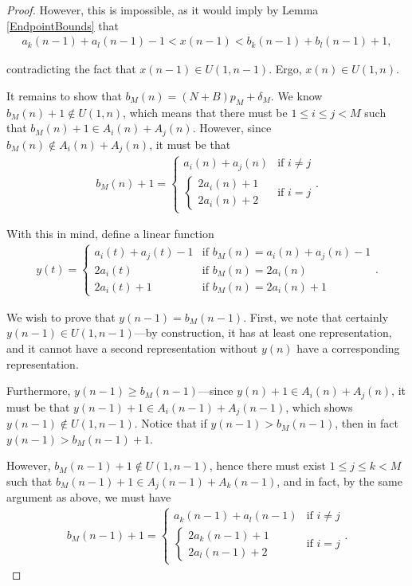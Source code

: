 \documentclass{amsart}
\theoremstyle{theorem}
\theoremstyle{definition}
\begin{document}
\begin{proof}
\noindent However, this is impossible, as it would imply by Lemma \ref{EndpointBounds} that
	\begin{align*}
    a_k(n - 1) + a_l(n - 1) - 1 < x(n - 1) < b_k(n - 1) + b_l(n - 1) + 1,
    \end{align*}
    
\noindent contradicting the fact that $x(n - 1) \in U(1,n - 1)$. Ergo, $x(n) \in U(1,n)$.

It remains to show that $b_M(n) = (N + B)p_M + \delta_M$. We know $b_M(n) + 1 \notin U(1,n)$, which means that there must be $1 \leq i \leq j < M$ such that $b_M(n) + 1 \in A_i(n) + A_j(n)$. However, since $b_M(n) \notin A_i(n) + A_j(n)$, it must be that
	\begin{align*}
    b_M(n) + 1 = \begin{cases} a_i(n) + a_j(n) & \text{if } i \neq j \\ \begin{cases} 2a_i(n) + 1 \\ 2a_i(n) + 2 \end{cases} & \text{if } i = j \end{cases}.
    \end{align*}
    
\noindent With this in mind, define a linear function
	\begin{align*}
    y(t) = \begin{cases} a_i(t) + a_j(t) - 1 & \text{if } b_M(n) = a_i(n) + a_j(n) - 1 \\ 2a_i(t) & \text{if } b_M(n) = 2a_i(n) \\  2a_i(t) + 1 & \text{if } b_M(n) = 2a_i(n) + 1 \end{cases}.
    \end{align*}
    
\noindent We wish to prove that $y(n - 1) = b_M(n - 1)$. First, we note that certainly $y(n - 1) \in U(1,n - 1)$---by construction, it has at least one representation, and it cannot have a second representation without $y(n)$ have a corresponding representation.

Furthermore, $y(n - 1) \geq b_M(n - 1)$---since $y(n) + 1 \in A_i(n) + A_j(n)$, it must be that $y(n - 1) + 1 \in A_i(n - 1) + A_j(n - 1)$, which shows $y(n - 1) \notin U(1, n - 1)$. Notice that if $y(n - 1) > b_M(n - 1)$, then in fact $y(n - 1) > b_M(n - 1) + 1$.

However, $b_M(n - 1) + 1 \notin U(1,n - 1)$, hence there must exist $1 \leq j \leq k < M$ such that $b_M(n - 1) + 1 \in A_j(n - 1) + A_k(n - 1)$, and in fact, by the same argument as above, we must have
	\begin{align*}
    b_M(n - 1) + 1 = \begin{cases} a_k(n - 1) + a_l(n - 1) & \text{if } i \neq j \\ \begin{cases} 2a_k(n - 1) + 1 \\ 2a_l(n - 1) + 2 \end{cases} & \text{if } i = j \end{cases}.
    \end{align*}
    

\end{proof}
\end{document}
